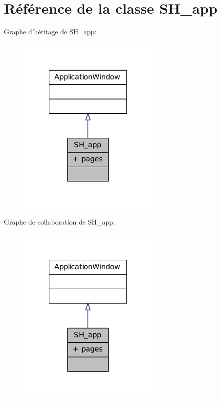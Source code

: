 \hypertarget{classSH__app}{\section{Référence de la classe S\-H\-\_\-app}
\label{classSH__app}
}


Graphe d'héritage de S\-H\-\_\-app\-:\nopagebreak
\begin{figure}[H]
\begin{center}
\leavevmode
\includegraphics[width=198pt]{classSH__app__inherit__graph}
\end{center}
\end{figure}


Graphe de collaboration de S\-H\-\_\-app\-:\nopagebreak
\begin{figure}[H]
\begin{center}
\leavevmode
\includegraphics[width=198pt]{classSH__app__coll__graph}
\end{center}
\end{figure}
